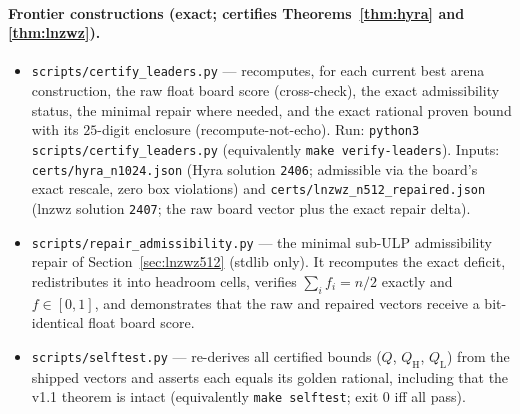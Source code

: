 \documentclass[11pt]{article}
\theoremstyle{remark}
\begin{document}
\paragraph{Frontier constructions (exact; certifies
Theorems~\ref{thm:hyra} and \ref{thm:lnzwz}).}
\begin{itemize}
\item \texttt{scripts/certify\_leaders.py} --- recomputes, for each current best
arena construction, the raw float board score (cross-check), the exact
admissibility status, the minimal repair where needed, and the exact rational
proven bound with its $25$-digit enclosure (recompute-not-echo). Run:
\texttt{python3 scripts/certify\_leaders.py} (equivalently
\texttt{make verify-leaders}). Inputs:
\texttt{certs/hyra\_n1024.json} (Hyra solution \texttt{2406}; admissible via the
board's exact rescale, zero box violations) and
\texttt{certs/lnzwz\_n512\_repaired.json} (lnzwz solution \texttt{2407}; the raw
board vector plus the exact repair delta).
\item \texttt{scripts/repair\_admissibility.py} --- the minimal sub-ULP
admissibility repair of Section~\ref{sec:lnzwz512} (stdlib only). It recomputes
the exact deficit, redistributes it into headroom cells, verifies
$\sum_i f_i = n/2$ exactly and $f \in [0,1]$, and demonstrates that the raw and
repaired vectors receive a bit-identical float board score.
\item \texttt{scripts/selftest.py} --- re-derives all certified bounds ($Q$,
$Q_{\mathrm H}$, $Q_{\mathrm L}$) from the shipped vectors and asserts each
equals its golden rational, including that the v1.1 theorem is intact
(equivalently \texttt{make selftest}; exit $0$ iff all pass).
\end{itemize}
\end{document}
